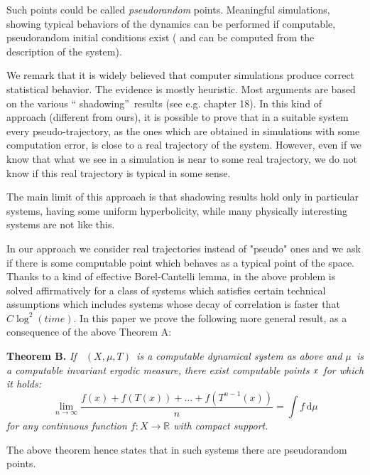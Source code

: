 \documentclass[copyright,creativecommons]{eptcs}
\numberwithin{equation}{section}
\begin{document}
Such points could be called \emph{pseudorandom} points. Meaningful
simulations, showing typical behaviors of the dynamics can be performed if
computable, pseudorandom initial conditions exist ( and can be computed from the
description of the system).

We remark that it is widely believed that computer simulations produce
correct statistical behavior. The evidence is mostly heuristic. Most
arguments are based on the various \textquotedblleft
shadowing\textquotedblright\ results (see e.g. \cite{KH} chapter 18). In
this kind of approach (different from ours), it is possible to prove that in
a suitable system every pseudo-trajectory, as the ones which are obtained in
simulations with some computation error, is close to a real trajectory of
the system. However, even if we know that what we see in a simulation is
near to some real trajectory, we do not know if this real trajectory is
typical in some sense.

The main limit of this approach is that shadowing results hold only in
particular systems, having some uniform hyperbolicity, while many physically
interesting systems are not like this.

In our approach we consider real trajectories instead of "pseudo" ones and
we ask if there is some computable point which behaves as a typical point of
the space. Thanks to a kind of effective Borel-Cantelli lemma, in \cite {GHR07} the above problem is solved affirmatively for a class of systems
which satisfies certain technical assumptions which includes systems whose
decay of correlation is faster that $C\log ^{2}(time)$. In this paper we
prove the following more general result, as a consequence of the above
Theorem A:\newline

\noindent \textbf{Theorem B. }\emph{If \ }$(X,\mu ,T)$\emph{\ is a
computable dynamical system as above and }$\mu $\emph{\ is a computable
invariant ergodic measure,} \emph{there exist computable points }$\emph{x}$\emph{\ for which it holds:}\begin{equation}
\underset{n\rightarrow \infty }{\lim }\frac{f(x)+f(T(x))+\ldots
+f(T^{n-1}(x))}{n}=\int \!{f}\,\mathrm{d}{\mu }  \label{typic}
\end{equation}\emph{for any continuous function $f:X\rightarrow \mathbb{R}$ with compact
support.} \newline

The above theorem hence states that in such systems there are pseudorandom
points.
\end{document}

